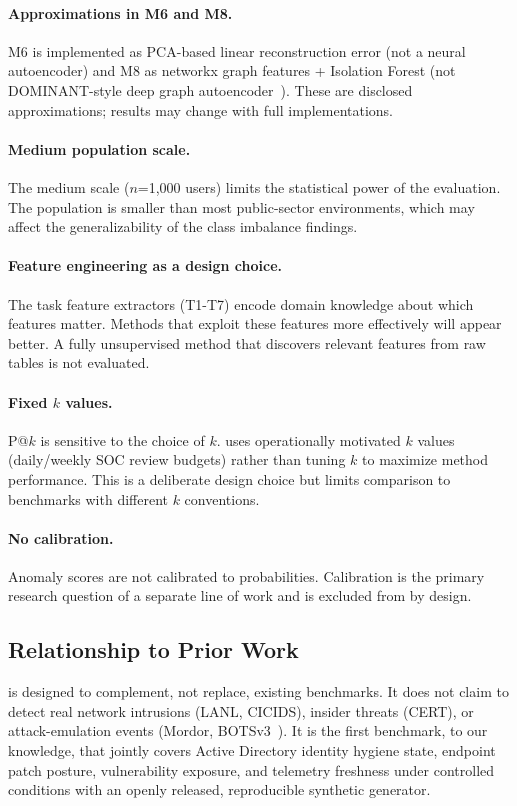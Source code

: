 \paragraph{Approximations in M6 and M8.}
M6 is implemented as PCA-based linear reconstruction error (not a neural
autoencoder) and M8 as networkx graph features + Isolation Forest (not
DOMINANT-style deep graph autoencoder~\cite{ding2019dominant}). These are disclosed
approximations; results may change with full implementations.

\paragraph{Medium population scale.}
The medium scale ($n$=1,000 users) limits the statistical power of the evaluation. The
population is smaller than most public-sector environments, which may affect the
generalizability of the class imbalance findings.

\paragraph{Feature engineering as a design choice.}
The task feature extractors (T1-T7) encode domain knowledge about which features
matter. Methods that exploit these features more effectively will appear better. A
fully unsupervised method that discovers relevant features from raw tables is not
evaluated.

\paragraph{Fixed $k$ values.}
P@$k$ is sensitive to the choice of $k$. \hygienebench uses operationally motivated
$k$ values (daily/weekly SOC review budgets) rather than tuning $k$ to maximize
method performance. This is a deliberate design choice but limits comparison to
benchmarks with different $k$ conventions.

\paragraph{No calibration.}
Anomaly scores are not calibrated to probabilities. Calibration is the primary
research question of a separate line of work and is excluded from \hygienebench by
design.

\subsection{Relationship to Prior Work}

\hygienebench is designed to complement, not replace, existing benchmarks. It does
not claim to detect real network intrusions (LANL, CICIDS), insider threats (CERT),
or attack-emulation events (Mordor, BOTSv3~\cite{splunk_botsv3}). It is the first benchmark, to our
knowledge, that jointly covers Active Directory identity hygiene state, endpoint
patch posture, vulnerability exposure, and telemetry freshness under controlled
conditions with an openly released, reproducible synthetic generator.
